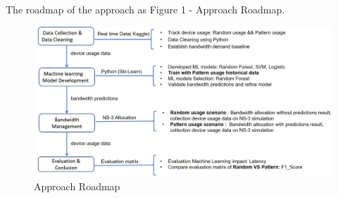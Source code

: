 \documentclass[10pt]{article}
\begin{document}
\paragraph{}
The roadmap of the approach as Figure 1 - Approach Roadmap.
\begin{figure}[H]
    \centering
    \includegraphics[width=1\linewidth]{Approach Roadmap.jpg}
    \caption{Approach Roadmap}
    \label{fig:enter-label}
\end{figure}
\end{document}
